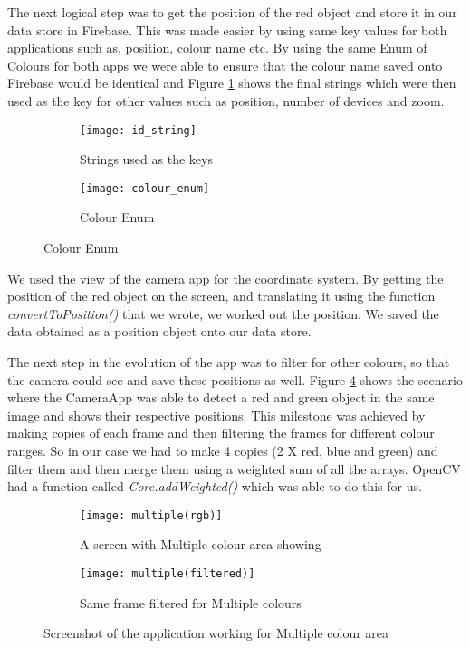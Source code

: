The next logical step was to get the position of the red object and store it in our data store in Firebase. This was made easier by using same key values for both applications such as, position, colour name etc. By using the same Enum of Colours for both apps we were able to ensure that the colour name saved onto Firebase would be identical and Figure \ref{id_string} shows the final strings which were then used as the key for other values such as position, number of devices and zoom.

\begin{figure}[H]
        \centering
            \begin{subfigure}[b]{0.47\textwidth}
        \centering
        \texttt{[image: id\_string]}
        \caption{Strings used as the keys}
        \label{id_string}
         \end{subfigure}
    \hfill
    \begin{subfigure}[b]{0.47\textwidth}
        \centering
        \texttt{[image: colour\_enum]}
        \caption{Colour Enum}
        \label{colour_enum}
    \end{subfigure}
    \hfill
\end{figure}

We used the view of the camera app for the coordinate system. By getting the position of the red object on the screen, and translating it using the function \emph{convertToPosition()} that we wrote, we worked out the position. We saved the data obtained as a position object onto our data store.

The next step in the evolution of the app was to filter for other colours, so that the camera could see and save these positions as well. Figure \ref{filtered_multiple} shows the scenario where the CameraApp was able to detect a red and green object in the same image and shows their respective positions. This milestone was achieved by making copies of each frame and then filtering the frames for different colour ranges. So in our case we had to make 4 copies (2 X red, blue and green) and filter them and then merge them using a weighted sum of all the arrays. OpenCV had a function called \emph{Core.addWeighted()} which was able to do this for us.
\begin{figure}[H]
    \centering
    \begin{subfigure}[b]{0.47\textwidth}
        \centering
        \texttt{[image: multiple(rgb)]}
        \caption{A screen with Multiple colour area showing}
    \end{subfigure}
    \hfill
    \begin{subfigure}[b]{0.47\textwidth}
        \centering
        \texttt{[image: multiple(filtered)]}
        \caption{Same frame filtered for Multiple colours}
    \end{subfigure}
    \hfill
    \caption{Screenshot of the application working for Multiple colour area}
     \label{filtered_multiple}
\end{figure}



